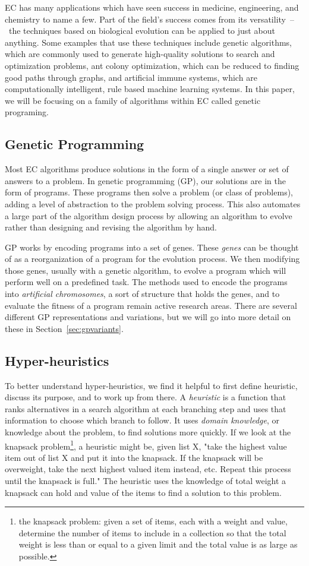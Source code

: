 \documentclass{sig-alternate}
\begin{document}
EC has many applications which have seen success in medicine, engineering, and chemistry to name a few. Part of the field's success comes from its versatility~--~the techniques based on biological evolution can be applied to just about anything. Some examples that use these techniques include genetic algorithms, which are commonly used to generate high-quality solutions to search and optimization problems, ant colony optimization, which can be reduced to finding good paths through graphs, and artificial immune systems, which are computationally intelligent, rule based machine learning systems. In this paper, we will be focusing on a family of algorithms within EC called genetic programing.

\subsection{Genetic Programming}
\label{sec:GP}
Most EC algorithms produce solutions in the form of a single answer or set of answers to a problem. In genetic programming (GP), our solutions are in the form of programs. These programs then solve a problem (or class of problems), adding a level of abstraction to the problem solving process. This also automates a large part of the algorithm design process by allowing an algorithm to evolve rather than designing and revising the algorithm by hand.

GP works by encoding programs into a set of genes. These \textit{genes} can be thought of as a reorganization of a program for the evolution process. We then modifying those genes, usually with a genetic algorithm, to evolve a program which will perform well on a predefined task. The methods used to encode the programs into \textit{artificial chromosomes}, a sort of structure that holds the genes, and to evaluate the fitness of a program remain active research areas. There are several different GP representations and variations, but we will go into more detail on these in Section~\ref{sec:gpvariants}.

\subsection{Hyper-heuristics}
\label{sec:HH}
To better understand hyper-heuristics, we find it helpful to first define heuristic, discuss its purpose, and to work up from there. A \textit{heuristic} is a function that ranks alternatives in a search algorithm at each branching step and uses that information to choose which branch to follow. It uses \textit{domain knowledge}, or knowledge about the problem, to find solutions more quickly. If we look at the knapsack problem\footnote{the knapsack problem: given a set of items, each with a weight and value, determine the number of items to include in a collection so that the total weight is less than or equal to a given limit and the total value is as large as possible.}, a heuristic might be, given list X, "take the highest value item out of list X and put it into the knapsack. If the knapsack will be overweight, take the next highest valued item instead, etc. Repeat this process until the knapsack is full." The heuristic uses the knowledge of total weight a knapsack can hold and value of the items to find a solution to this problem.
\end{document}
